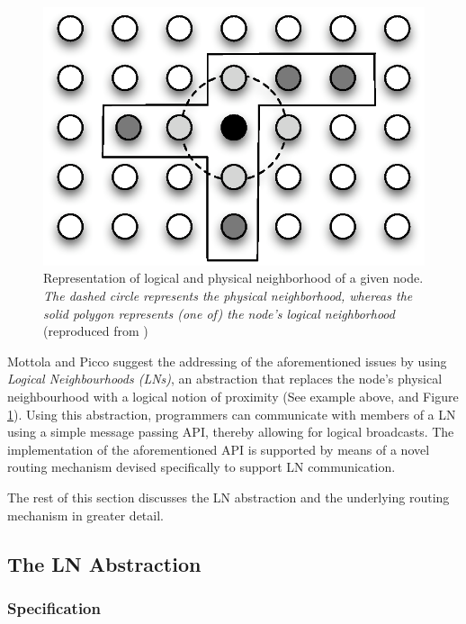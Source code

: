 \begin{figure} 
\centering
\label{Fig:LN_physical_vs_logical}
\includegraphics[scale=0.65]{img/LN_physical_vs_logical.eps} 
\caption[Difference between physical and logical neighborhoods]{Representation 
of logical and physical neighborhood of a given node. \emph{The dashed circle 
represents the physical neighborhood, whereas the solid polygon represents (one 
of) the node's logical neighborhood} (reproduced from
\cite{mottola_LN:2006})}
\end{figure} 

Mottola and Picco \cite{mottola_LN:2006} suggest the addressing of the
aforementioned issues by using \emph{Logical Neighbourhoods (LNs)}, an abstraction
that replaces the node's physical neighbourhood with a logical notion of
proximity (See example above, and Figure \ref{Fig:LN_physical_vs_logical}). Using this abstraction, programmers
can communicate
with members of a LN using a simple message passing API,
thereby allowing for logical broadcasts. The implementation of the aforementioned API is
supported by means of a novel routing mechanism devised specifically to support
LN communication.

The rest of this section discusses the LN abstraction and the
underlying routing mechanism in greater detail.

\subsection{The LN Abstraction}

\subsubsection{Specification}

